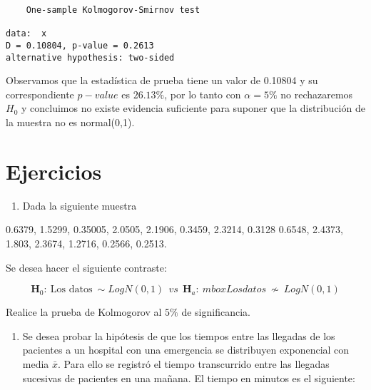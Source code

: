 \documentclass[
  a4paper,
  oneside,
  openany]{book}
\newenvironment{Shaded}{\begin{snugshade}}{\end{snugshade}}
\newcommand{\DecValTok}[1]{\textcolor[rgb]{0.00,0.00,0.81}{#1}}
\newcommand{\FunctionTok}[1]{\textcolor[rgb]{0.00,0.00,0.00}{#1}}
\newcommand{\NormalTok}[1]{#1}
\newcommand{\OtherTok}[1]{\textcolor[rgb]{0.56,0.35,0.01}{#1}}
\newcommand{\SpecialCharTok}[1]{\textcolor[rgb]{0.00,0.00,0.00}{#1}}
\newcommand{\StringTok}[1]{\textcolor[rgb]{0.31,0.60,0.02}{#1}}
\providecommand{\tightlist}{%
  \setlength{\itemsep}{0pt}\setlength{\parskip}{0pt}}
\begin{document}
\begin{Shaded}
\end{Shaded}

\begin{verbatim}
    One-sample Kolmogorov-Smirnov test

data:  x
D = 0.10804, p-value = 0.2613
alternative hypothesis: two-sided
\end{verbatim}

Observamos que la estadística de prueba tiene un valor de 0.10804 y su correspondiente \(p-value\) es \(26.13\%\), por lo tanto con \(\alpha=5\%\) no rechazaremos \(H_0\) y concluimos no existe evidencia suficiente para suponer que la distribución de la muestra no es normal(0,1).

\hypertarget{ejercicios-12}{%
\section{Ejercicios}\label{ejercicios-12}}

\begin{enumerate}
\def\labelenumi{\arabic{enumi}.}
\tightlist
\item
  Dada la siguiente muestra
\end{enumerate}

0.6379, 1.5299, 0.35005, 2.0505, 2.1906, 0.3459, 2.3214, 0.3128
0.6548, 2.4373, 1.803, 2.3674, 1.2716, 0.2566, 0.2513.

Se desea hacer el siguiente contraste:

\[\textbf{H}_0: \ \mbox{Los datos} \ \sim LogN(0,1) \ \ vs \ \ \textbf{H}_a: \ mbox{Los datos} \  \nsim \ LogN(0,1)\]

Realice la prueba de Kolmogorov al \(5\%\) de significancia.

\begin{enumerate}
\def\labelenumi{\arabic{enumi}.}
\setcounter{enumi}{1}
\tightlist
\item
  Se desea probar la hipótesis de que los tiempos entre las llegadas de los pacientes a un hospital con una emergencia se distribuyen exponencial con media \(\bar{x}\). Para ello se registró el tiempo transcurrido entre las llegadas sucesivas de pacientes en una mañana. El tiempo en minutos es el siguiente:
\end{enumerate}
\end{document}
